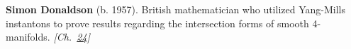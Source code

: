 \textbf{Simon Donaldson} (b. 1957). British mathematician who utilized Yang-Mills instantons to prove results regarding the intersection forms of smooth 4-manifolds. \emph{[Ch.~\hyperref[ch:4dspacetime]{24}]}

